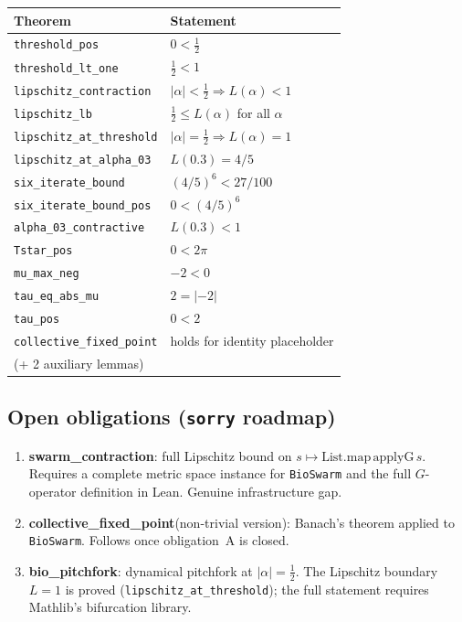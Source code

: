 \documentclass[12pt,a4paper]{article}
\begin{document}
\begin{center}
\small
\begin{tabular}{ll}
\toprule
Theorem & Statement \\
\midrule
\texttt{threshold\_pos}         & $0 < \tfrac{1}{2}$ \\
\texttt{threshold\_lt\_one}     & $\tfrac{1}{2} < 1$ \\
\texttt{lipschitz\_contraction} & $|\alpha|<\tfrac{1}{2}\Rightarrow L(\alpha)<1$ \\
\texttt{lipschitz\_lb}          & $\tfrac{1}{2}\le L(\alpha)$ for all $\alpha$ \\
\texttt{lipschitz\_at\_threshold} & $|\alpha|=\tfrac{1}{2}\Rightarrow L(\alpha)=1$ \\
\texttt{lipschitz\_at\_alpha\_03} & $L(0.3)=4/5$ \\
\texttt{six\_iterate\_bound}    & $(4/5)^{6}<27/100$ \\
\texttt{six\_iterate\_bound\_pos} & $0<(4/5)^{6}$ \\
\texttt{alpha\_03\_contractive} & $L(0.3)<1$ \\
\texttt{Tstar\_pos}             & $0<2\pi$ \\
\texttt{mu\_max\_neg}           & $-2<0$ \\
\texttt{tau\_eq\_abs\_mu}       & $2=|-2|$ \\
\texttt{tau\_pos}               & $0<2$ \\
\texttt{collective\_fixed\_point} & holds for identity placeholder \\
(+ 2 auxiliary lemmas)          & \\
\bottomrule
\end{tabular}
\end{center}

\subsection*{Open obligations (\texttt{sorry} roadmap)}

\begin{enumerate}[label=\Alph*.,leftmargin=2em]
  \item \textbf{swarm\_contraction}: full Lipschitz bound on
    $s\mapsto\mathrm{List.map}\,\mathrm{applyG}\,s$.  Requires a
    complete metric space instance for \texttt{BioSwarm} and the
    full $G$-operator definition in Lean.  Genuine infrastructure gap.
  \item \textbf{collective\_fixed\_point}\linebreak (non-trivial version):
    Banach's theorem applied to \texttt{BioSwarm}.  Follows once
    obligation~A is closed.
  \item \textbf{bio\_pitchfork}: dynamical pitchfork at
    $|\alpha|=\tfrac{1}{2}$.  The Lipschitz boundary $L=1$ is proved
    (\texttt{lipschitz\_at\_threshold}); the full statement requires
    Mathlib's bifurcation library.
\end{enumerate}
\end{document}
